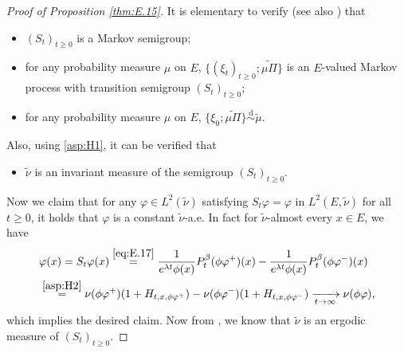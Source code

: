 \documentclass[12pt,a4paper]{amsart}
\numberwithin{equation}{section}
\theoremstyle{plain}
\theoremstyle{definition}
\theoremstyle{remark}
\begin{document}
\begin{proof}[Proof of Proposition \ref{thm:E.15}]
	It is elementary to verify (see also \cite{KimSong2008Intrinsic}) that
\begin{itemize}
\item
	$(S_t)_{t\geq 0}$ is a Markov semigroup;
\item
	for any probability measure $\mu$ on $E$, $\{(\xi_t)_{t\geq 0}; \widetilde{\mu \Pi}\}$ is an $E$-valued Markov process with transition semigroup $(S_t)_{t\geq 0}$;
\item
	for any probability measure $\mu$ on $E$, $\{\xi_0; \widetilde{\mu \Pi}\} \overset{\text{d}}\sim \widetilde \mu$.
\end{itemize}	
	Also, using \eqref{asp:H1}, it can be verified that
\begin{itemize}
	\item
	$\widetilde \nu$ is 
	an invariant measure of the
	semigroup $(S_t)_{t\geq 0}$.
\end{itemize}
	Now we claim that for any $\varphi \in L^2(\widetilde \nu)$ satisfying $S_t \varphi = \varphi$ in $L^2(E,\widetilde \nu)$ for all $t\geq 0$, it holds that $\varphi$ is a constant $\widetilde \nu$-a.e.
	In fact for $\widetilde \nu$-almost every $x\in E$, we have
\begin{align}
	&\varphi(x)
	= S_t \varphi(x)
	\overset{\eqref{eq:E.17}}= \frac{1}{e^{\lambda t}\phi(x)}P_t^\beta (\phi \varphi^+) (x) - \frac{1}{e^{\lambda t}\phi(x)}P_t^\beta (\phi \varphi^-) (x)
	\\&\overset{\eqref{asp:H2}}{=}  \nu(\phi \varphi^+) (1+ H_{t,x,\phi \varphi^+}) - \nu(\phi \varphi^-) (1+ H_{t,x,\phi \varphi^-})
	\xrightarrow[t\to \infty]{} \nu( \phi \varphi),
\end{align}
	which implies the desired claim.
	Now from \cite[Theorem 3.2.4.]{DaPratoZabczyk1996Ergodicity}, we know that $\widetilde \nu$ is an ergodic measure of $(S_t)_{t\geq 0}$.
\end{proof}
\end{document}
